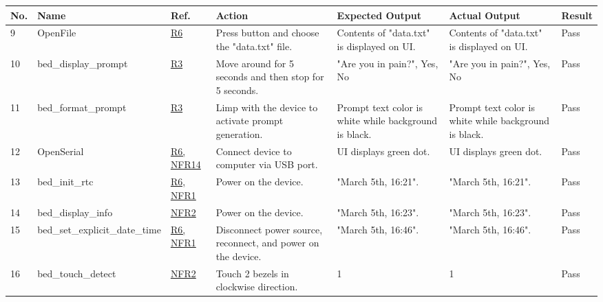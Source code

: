 \documentclass[12pt, titlepage]{article}
\begin{document}
\begin{center}
\begin{table} [H]
\begin{tabular}{ | p{0.5cm} | p{2.8cm} |  p{1.1cm} | p{2.7cm} | p{2.7cm} | p{2.7cm} | p{1.1cm} |}
\hline
\textbf{No.} & \textbf{Name}  & \textbf{Ref.} & \textbf{Action} & \textbf{Expected Output} & \textbf{Actual Output} & \textbf{Result} \\
\hline
9 & OpenFile & \href{https://github.com/zakerl/Capstone_Project/blob/main/docs/SRS/SRS.pdf}{R6} & Press button and choose the "data.txt" file. & Contents of "data.txt" is displayed on UI. & Contents of "data.txt" is displayed on UI.  & Pass \\ 
\hline
10 & bed\_display\newline \_prompt & \href{https://github.com/zakerl/Capstone_Project/blob/main/docs/SRS/SRS.pdf}{R3} & Move around for 5 seconds and then stop for 5 seconds. & "Are you in pain?", Yes, No & "Are you in pain?", Yes, No & Pass \\ 
\hline
11 & bed\_format\newline \_prompt & \href{https://github.com/zakerl/Capstone_Project/blob/main/docs/SRS/SRS.pdf}{R3} & Limp with the device to activate prompt generation. & Prompt text color is white while background is black. & Prompt text color is white while background is black.  & Pass \\ 
\hline
12 & OpenSerial & \href{https://github.com/zakerl/Capstone_Project/blob/main/docs/SRS/SRS.pdf}{R6, NFR14} & Connect device to computer via USB port. & UI displays green dot. & UI displays green dot. & Pass \\ 
\hline
13 & bed\_init\_rtc & \href{https://github.com/zakerl/Capstone_Project/blob/main/docs/SRS/SRS.pdf}{R6, NFR1} & Power on the device. & "March 5th, 16:21". & "March 5th, 16:21". & Pass \\ 
\hline
14 & bed\_display\_info & \href{https://github.com/zakerl/Capstone_Project/blob/main/docs/SRS/SRS.pdf}{NFR2} & Power on the device. & "March 5th, 16:23". & "March 5th, 16:23". & Pass \\ 
\hline
15 & bed\_set\newline \_explicit\_date\newline \_time & \href{https://github.com/zakerl/Capstone_Project/blob/main/docs/SRS/SRS.pdf}{R6, NFR1} & Disconnect power source, reconnect, and power on the device. & "March 5th, 16:46". & "March 5th, 16:46". & Pass \\ 
\hline
16 & bed\_touch\newline \_detect & \href{https://github.com/zakerl/Capstone_Project/blob/main/docs/SRS/SRS.pdf}{NFR2} & Touch 2 bezels in clockwise direction. & 1 & 1 & Pass \\ 

\end{tabular}
\end{table}
\end{center}
\end{document}
